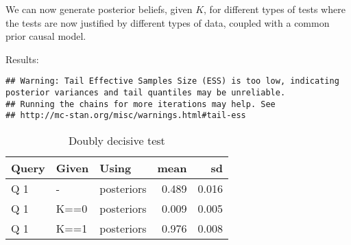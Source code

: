 \documentclass[
  12pt,
]{book}
\newenvironment{Shaded}{\begin{snugshade}}{\end{snugshade}}
\newcommand{\FloatTok}[1]{\textcolor[rgb]{0.00,0.00,0.81}{#1}}
\newcommand{\KeywordTok}[1]{\textcolor[rgb]{0.13,0.29,0.53}{\textbf{#1}}}
\newcommand{\NormalTok}[1]{#1}
\newcommand{\OperatorTok}[1]{\textcolor[rgb]{0.81,0.36,0.00}{\textbf{#1}}}
\newcommand{\StringTok}[1]{\textcolor[rgb]{0.31,0.60,0.02}{#1}}
\begin{document}
We can now generate posterior beliefs, given \(K\), for different types of tests where the tests are now justified by different types of data, coupled with a common prior causal model.

Results:

\begin{Shaded}
\end{Shaded}

\begin{verbatim}
## Warning: Tail Effective Samples Size (ESS) is too low, indicating posterior variances and tail quantiles may be unreliable.
## Running the chains for more iterations may help. See
## http://mc-stan.org/misc/warnings.html#tail-ess
\end{verbatim}

\begin{table}

\caption{\label{tab:unnamed-chunk-91}Doubly decisive test}
\centering
\begin{tabular}[t]{l|l|l|r|r}
\hline
Query & Given & Using & mean & sd\\
\hline
Q 1 & - & posteriors & 0.489 & 0.016\\
\hline
Q 1 & K==0 & posteriors & 0.009 & 0.005\\
\hline
Q 1 & K==1 & posteriors & 0.976 & 0.008\\
\hline
\end{tabular}
\end{table}
\end{document}
